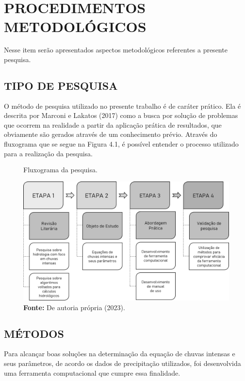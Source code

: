 \chapter{PROCEDIMENTOS METODOLÓGICOS}

Nesse item serão apresentados aspectos metodológicos referentes a
presente pesquisa.

\section{TIPO DE PESQUISA}

O método de pesquisa utilizado no presente trabalho é de caráter prático. Ela é descrita por Marconi e Lakatos (2017) como a busca por solução de problemas que ocorrem na realidade a partir da aplicação prática de resultados, que obviamente são gerados através de um conhecimento prévio. Através do fluxograma que se segue na Figura 4.1, é possível entender o processo utilizado para a realização da pesquisa.\bigskip

\begin{figure}[!ht]
	\centering
	\caption{Fluxograma da pesquisa.}
	\includegraphics[width=.7625\linewidth]{figuras/fluxograma_de_pesquisa.png}
	\caption*{\textbf{Fonte:} De autoria própria (2023).}
	\label{fig:fluxograma_de_pesquisa.png}
\end{figure}


\section{MÉTODOS}

Para alcançar boas soluções na determinação da equação de chuvas intensas e seus parâmetros, de acordo os dados de precipitação utilizados, foi desenvolvida uma ferramenta computacional que cumpre essa finalidade.

